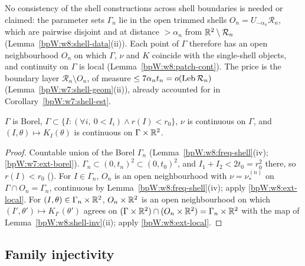 \begin{remark}\label{bpW:w8:boundaries}
No consistency of the shell constructions across shell boundaries is needed or claimed: the parameter sets $\Gamma_n$ lie in the
open trimmed shells $O_n=U_{-\alpha_n}\mathcal R_n$, which are pairwise disjoint and at distance $>\alpha_n$ from $\mathbb{R}^2\setminus\mathcal R_n$
(Lemma~\ref{bpW:w8:shell-data}(ii)). Each point of $\Gamma$ therefore has an open neighbourhood $O_n$ on which $\Gamma$, $\nu$ and $K$
coincide with the single-shell objects, and continuity on $\Gamma$ is local (Lemma~\ref{bpW:w8:patch-cont}). The price is the boundary
layer $\mathcal R_n\setminus O_n$, of measure $\le7\alpha_nt_n=o(\operatorname{Leb}\mathcal R_n)$ (Lemma~\ref{bpW:w7:shell-geom}(ii)), already
accounted for in Corollary~\ref{bpW:w7:shell-est}.
\end{remark}

\begin{lemma}\label{bpW:w8:patch-cont}
$\Gamma$ is Borel, $\Gamma\subset\{I:(\forall i,\ 0<I_i)\wedge r(I)<r_0\}$, $\nu$ is continuous on $\Gamma$, and
$(I,\theta)\mapsto K_I(\theta)$ is continuous on $\Gamma\times\mathbb{R}^2$.
\end{lemma}
\begin{proof}
\label{stepW:w8:pc-borel} Countable union of the Borel $\Gamma_n$ (Lemma~\ref{bpW:w8:freq-shell}(iv); \ref{bpW:w7:ext-borel}).
\label{stepW:w8:pc-incl} $\Gamma_n\subset(0,t_n)^2\subset(0,t_0)^2$, and $I_1+I_2<2t_0=r_0^2$ there, so
$r(I)<r_0$ ().
\label{stepW:w8:pc-nu} For $I\in\Gamma_n$, $O_n$ is an open neighbourhood with $\nu=\nu^{(n)}_*$ on $\Gamma\cap O_n=\Gamma_n$,
continuous by Lemma~\ref{bpW:w8:freq-shell}(iv); apply \ref{bpW:w8:ext-local}.
\label{stepW:w8:pc-K} For $(I,\theta)\in\Gamma_n\times\mathbb{R}^2$, $O_n\times\mathbb{R}^2$ is an open neighbourhood on which
$(I',\theta')\mapsto K_{I'}(\theta')$ agrees on $(\Gamma\times\mathbb{R}^2)\cap(O_n\times\mathbb{R}^2)=\Gamma_n\times\mathbb{R}^2$ with the map of
Lemma~\ref{bpW:w8:shell-inv}(ii); apply \ref{bpW:w8:ext-local}.
\end{proof}

\subsection{Family injectivity}\label{bpW:w8:inj-sec}

